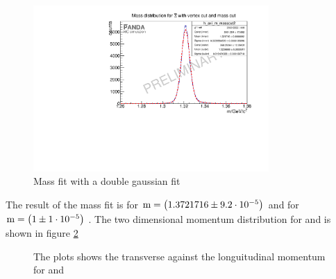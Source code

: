 		\begin{figure}
			\centering
				\includegraphics[width=0.8\textwidth]{./plots/Xi/XiPlus_m_masscut.pdf}
			\caption{Mass fit with a double gaussian fit}
			\label{fig:XiPlus_massfit}
		\end{figure}
		The result of the mass fit is for \anticascade $\textnormal{m} = \left( 1.3721716 \pm 9.2\cdot 10^{-5}\right)$ \massunit 
		and for \cascade $\textnormal{m} = \left( 1\pm 1\cdot 10^{-5}\right)$ \massunit.
		The two dimensional momentum distribution for \anticascade and \cascade is shown in figure \ref{fig:XiPlus_pt_vs_pz} 
		
		\begin{figure}
			\caption{The plots shows the transverse against the longuitudinal momentum for \anticascade and \cascade}
			\label{fig:XiPlus_pt_vs_pz}
		
		\end{figure}
		
